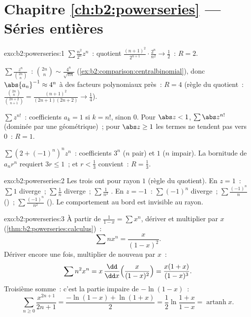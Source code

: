 \section*{Chapitre \ref{ch:b2:powerseries} --- Séries entières}

\begin{solution}{exo:b2:powerseries:1}
$\sum \frac{n^2}{2^n}z^n$~: quotient $\frac{(n+1)^2}{2^{n+1}}\cdot
\frac{2^n}{n^2} \to \frac12$~: $R = 2$.

$\sum \frac{z^n}{\binom{2n}{n}}$~: $\binom{2n}{n} \sim
\frac{4^n}{\sqrt{\pi n}}$ (\cref{ex:b2:comparison:centralbinomial}),
donc $\abs{a_n}^{-1} \approx 4^n$ à des facteurs polynomiaux près~: $R = 4$
(règle du quotient~: $\frac{\binom{2n}{n}}{\binom{2n+2}{n+1}} =
\frac{(n+1)^2}{(2n+1)(2n+2)} \to \frac14$).

$\sum z^{n!}$~: coefficients $a_k = 1$ si $k = n!$, sinon $0$. Pour
$\abs z < 1$, $\sum \abs z^{n!}$  (dominée par une géométrique)~;
pour $\abs z \geq 1$ les termes ne tendent pas vers $0$~: $R = 1$.

$\sum (2 + (-1)^n)^n z^n$~: coefficients $3^n$ ($n$ pair) et $1$
($n$ impair). La bornitude de $a_nr^n$ requiert $3r \leq 1$~; et $r <
\frac13$ convient~: $R = \frac13$.
\end{solution}

\begin{solution}{exo:b2:powerseries:2}
Les trois ont pour rayon $1$ (règle du quotient). En $z = 1$~: $\sum 1$
diverge~; $\sum\frac1n$ diverge~; $\sum\frac{1}{n^2}$ . En
$z = -1$~: $\sum(-1)^n$ diverge~; $\sum\frac{(-1)^n}{n}$ 
()~; $\sum\frac{(-1)^n}{n^2}$  ().
Le comportement au bord est invisible au rayon.
\end{solution}

\begin{solution}{exo:b2:powerseries:3}
À partir de $\frac{1}{1-x} = \sum x^n$, dériver et multiplier par $x$
(\cref{thm:b2:powerseries:calculus})~:
\[
\sum n x^n = \frac{x}{(1-x)^2} .
\]
Dériver encore une fois, multiplier de nouveau par $x$~:
\[
\sum n^2 x^n = x\,\frac{\dd}{\dd x}\Bigl(\frac{x}{(1-x)^2}\Bigr)
= \frac{x(1 + x)}{(1-x)^3} .
\]
Troisième somme~: c'est la partie impaire de $-\ln(1 - x)$~:
\[
\sum_{n\geq0} \frac{x^{2n+1}}{2n+1}
= \frac{-\ln(1-x) + \ln(1+x)}{2}
= \frac12 \ln\frac{1+x}{1-x}
= \operatorname{artanh} x .
\]
\end{solution}

